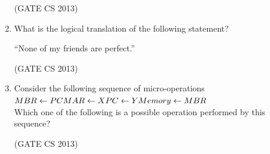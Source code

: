 \documentclass[a4paper, 11pt]{article}
\begin{document}
\begin{enumerate}
     \hfill (GATE CS 2013)

     \item What is the logical translation of the following statement? 
     \begin{center}
         “None of my friends are perfect.”
     \end{center}
     \begin{enumerate}
     \end{enumerate}

     \hfill (GATE CS 2013)
     
     \item Consider the following sequence of micro-operations\\
     
    $MBR \leftarrow PC\\
    MAR \leftarrow X\\
    PC \leftarrow Y\\
    Memory \leftarrow MBR $\\
     
     Which one of the following is a possible operation performed by this sequence? 
     \begin{enumerate}
     \end{enumerate}

     \hfill (GATE CS 2013)


\end{enumerate}
\end{document}
